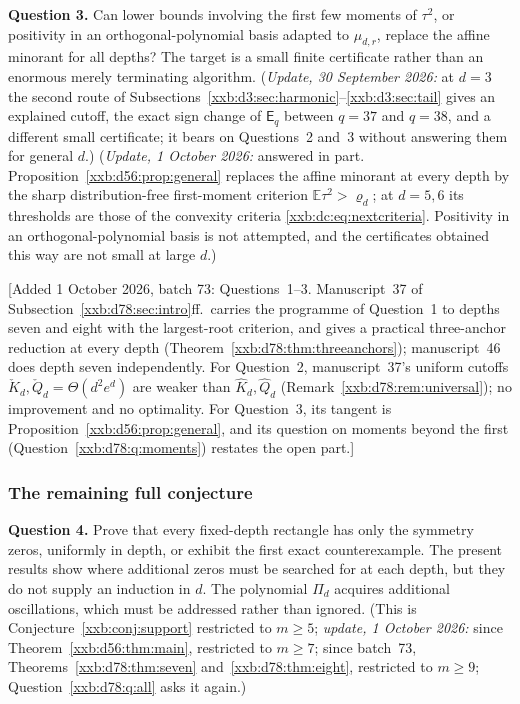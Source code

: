 \documentclass[11pt,a4paper]{article}
\numberwithin{equation}{section}
\theoremstyle{definition}
\theoremstyle{remark}
\theoremstyle{plain}
\begin{document}
\textbf{Question 3.}  Can lower bounds involving the first few moments of
$\tau^2$, or positivity in an orthogonal-polynomial basis adapted to
$\mu_{d,r}$, replace the affine minorant for all depths?  The target is a
small finite certificate rather than an enormous merely terminating
algorithm.
(\emph{Update, 30 September 2026:} at $d=3$ the second route of
Subsections~\ref{xxb:d3:sec:harmonic}--\ref{xxb:d3:sec:tail} gives an
explained cutoff, the exact sign change of $\mathsf E_q$ between $q=37$ and
$q=38$, and a different small certificate; it bears on Questions~2 and~3
without answering them for general $d$.)
(\emph{Update, 1 October 2026:} answered in part.
Proposition~\ref{xxb:d56:prop:general} replaces the affine minorant at every
depth by the sharp distribution-free first-moment criterion
$\mathbb E\tau^2>\varrho_d$; at $d=5,6$ its thresholds are those of the
convexity criteria \eqref{xxb:dc:eq:nextcriteria}.  Positivity in an orthogonal-polynomial basis is
not attempted, and the certificates obtained this way are not small at large
$d$.)

[Added 1 October 2026, batch 73: Questions~1--3.  Manuscript~37 of
Subsection~\ref{xxb:d78:sec:intro}ff.\ carries the programme of Question~1 to
depths seven and eight with the largest-root criterion, and gives a practical
three-anchor reduction at every depth (Theorem~\ref{xxb:d78:thm:threeanchors});
manuscript~46 does depth seven independently.  For Question~2, manuscript~37's
uniform cutoffs $\check K_d,\check Q_d=\Theta(d^2e^d)$ are weaker than
$\widehat K_d,\widehat Q_d$ (Remark~\ref{xxb:d78:rem:universal}); no
improvement and no optimality.  For Question~3, its tangent is
Proposition~\ref{xxb:d56:prop:general}, and its question on moments beyond the
first (Question~\ref{xxb:d78:q:moments}) restates the open part.]

\subsubsection{The remaining full conjecture}
\textbf{Question 4.}  Prove that every fixed-depth rectangle has only the
symmetry zeros, uniformly in depth, or exhibit the first exact
counterexample.  The present results show where additional zeros must be
searched for at each depth, but they do not supply an induction in $d$.
The polynomial $\Pi_d$ acquires additional oscillations, which must be
addressed rather than ignored.  (This is Conjecture~\ref{xxb:conj:support}
restricted to $m\ge5$; \emph{update, 1 October 2026:} since
Theorem~\ref{xxb:d56:thm:main}, restricted to $m\ge7$; since batch~73,
Theorems~\ref{xxb:d78:thm:seven} and~\ref{xxb:d78:thm:eight}, restricted to
$m\ge9$; Question~\ref{xxb:d78:q:all} asks it again.)
\end{document}
